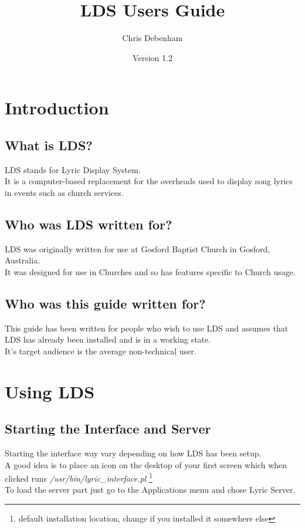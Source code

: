 \documentclass[11pt,twoside]{book}
\title{LDS Users Guide}
\author{Chris Debenham}
\date{Version 1.2}
\begin{document}
\maketitle
\tableofcontents{}


%
%

\chapter{Introduction}


\section{What is LDS?}

LDS stands for Lyric Display System.\\
 It is a computer-based replacement for the overheads used to display
song lyrics in events such as church services.


\section{Who was LDS written for?}

LDS was originally written for use at Gosford Baptist Church in Gosford,
Australia.\\
 It was designed for use in Churches and so has features specific
to Church usage.


\section{Who was this guide written for?}

This guide has been written for people who wish to use LDS and assumes
that LDS has already been installed and is in a working state.\\
 It's target audience is the average non-technical user.



%
%

\chapter{Using LDS}


\section{Starting the Interface and Server}

Starting the interface way vary depending on how LDS has been setup.\\
A good idea is to place an icon on the desktop of your first screen
which when clicked runs  \emph{/usr/bin/lyric\_interface.pl }%
\footnote{default installation location, change if you installed it somewhere else
}\\
To load the server part just go to the Applications menu and chose
Lyric Server.
\end{document}

